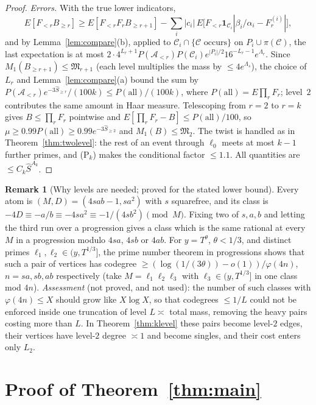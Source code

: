\documentclass[11pt,reqno]{amsart}
\theoremstyle{definition}
\newtheorem{remark}[theorem]{Remark}
\begin{document}
\begin{proof}
\emph{Errors.}  With the true lower indicators,
\[
 E[F_{<r}B_{\ge r}]\ge E[F_{<r}F_rB_{\ge r+1}]-\sum_i|c_i|\,E\big[F_{<r}\mathbf 1_{\mathcal C_i}|\beta_i/\alpha_i-F_r^{(i)}|\big],
\]
and by Lemma~\ref{lem:compare}(b), applied to $\mathcal C_i\cap\{\mathcal C\text{ occurs}\}$ on
$P_i\cup\pi(\mathcal C)$, the last expectation is at most
$2\cdot4^{L_r+1}P(\mathcal A_{<r})P(\mathcal C_i)e^{|P_i|/2}16^{-L_r-1}e^{\Lambda_r}$.
Since $M_1(B_{\ge r+1})\le\mathfrak M_{r+1}$ (each level multiplies the mass by
$\le4e^{\Lambda_s}$), the choice of $L_r$ and Lemma~\ref{lem:compare}(a) bound the sum
by $P(\mathcal A_{<r})e^{-3\hat S_{\ge r}}/(100k)\le P(\text{all})/(100k)$, where
$P(\text{all})=E\prod_rF_r$; level~$2$ contributes the same amount in Haar
measure.  Telescoping from $r=2$ to $r=k$ gives $B\le\prod_rF_r$ pointwise and
$E[\prod_rF_r-B]\le P(\text{all})/100$, so
$\mu\ge0.99P(\text{all})\ge0.99e^{-3\hat S_{\ge2}}$ and $M_1(B)\le\mathfrak M_2$.  The
twist is handled as in Theorem~\ref{thm:twolevel}: the rest of an event through
$\ell_0$ meets at most $k-1$ further primes, and (P$_k$) makes the conditional
factor $\le1.1$.  All quantities are $\le C_k\hat S^{A_k}$.
\end{proof}

\begin{remark}[Why levels are needed; proved for the stated lower bound]\label{rem:hubs}
Every atom is $(M,D)=(4sab-1,sa^2)$ with $s$ squarefree, and its class is
$-4D\equiv-a/b\equiv-4sa^2\equiv-1/(4sb^2)\pmod M$.  Fixing two of $s,a,b$ and
letting the third run over a progression gives a class which is the same
rational at every $M$ in a progression modulo $4sa$, $4sb$ or $4ab$.  For
$y=T^\theta$, $\theta<1/3$, and distinct primes $\ell_1,\ell_2\in(y,T^{1/3}]$,
the prime number theorem in progressions shows that such a pair of vertices
has codegree $\ge(\log(1/(3\theta))-o(1))/\varphi(4n)$, $n=sa,sb,ab$
respectively (take $M=\ell_1\ell_2\ell_3$ with $\ell_3\in(y,T^{1/3}]$ in one class
mod $4n$).  \emph{Assessment} (not proved, and not used): the number of such
classes with $\varphi(4n)\le X$ should grow like $X\log X$, so that codegrees
$\le1/L$ could not be enforced inside one truncation of level $L\asymp$ total
mass, removing the heavy pairs costing more than $L$.  In
Theorem~\ref{thm:klevel} these pairs become level-$2$ edges, their vertices
have level-$2$ degree $\asymp1$ and become singles, and their cost enters only
$L_2$.
\end{remark}

\section{Proof of Theorem~\ref{thm:main}}\label{sec:main}
\end{document}
